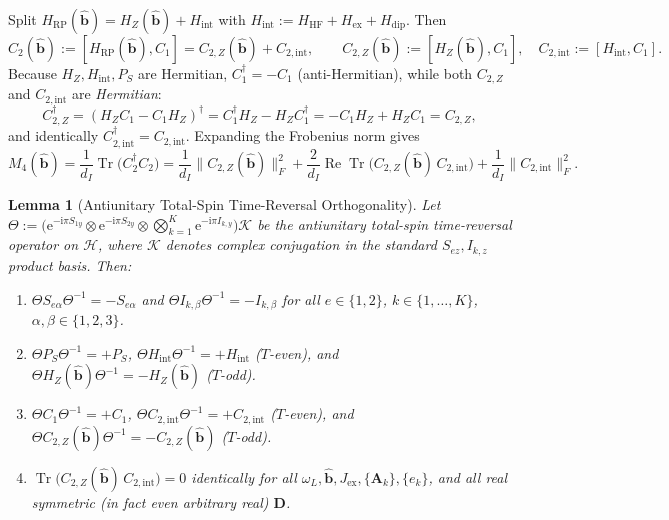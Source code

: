 \documentclass[onecolumn,10pt,notitlepage,amsmath,amssymb,floatfix]{revtex4-2}
\theoremstyle{plain}
\newtheorem{lemma}[theorem]{Lemma}
\theoremstyle{definition}
\newcommand{\ii}{\mathrm{i}}
\newcommand{\ee}{\mathrm{e}}
\newcommand{\Tr}{\operatorname{Tr}}
\newcommand{\PS}{P_S}
\newcommand{\HRP}{H_{\mathrm{RP}}}
\newcommand{\HZ}{H_Z}
\newcommand{\HHF}{H_{\mathrm{HF}}}
\newcommand{\Hex}{H_{\mathrm{ex}}}
\newcommand{\Hdip}{H_{\mathrm{dip}}}
\newcommand{\Hint}{H_{\mathrm{int}}}
\begin{document}
Split $\HRP(\hat{\mathbf{b}}) = \HZ(\hat{\mathbf{b}}) + \Hint$ with $\Hint := \HHF + \Hex + \Hdip$. Then
\begin{equation}
\label{eq:S1_C2_split}
C_2(\hat{\mathbf{b}}) := [\HRP(\hat{\mathbf{b}}), C_1] = C_{2,Z}(\hat{\mathbf{b}}) + C_{2,\mathrm{int}}, \qquad
C_{2,Z}(\hat{\mathbf{b}}) := [\HZ(\hat{\mathbf{b}}), C_1], \quad
C_{2,\mathrm{int}} := [\Hint, C_1].
\end{equation}
Because $\HZ, \Hint, \PS$ are Hermitian, $C_1^\dagger = -C_1$ (anti-Hermitian), while both $C_{2,Z}$ and $C_{2,\mathrm{int}}$ are \emph{Hermitian}:
\[
C_{2,Z}^\dagger = (\HZ C_1 - C_1 \HZ)^\dagger = C_1^\dagger \HZ - \HZ C_1^\dagger = -C_1 \HZ + \HZ C_1 = C_{2,Z},
\]
and identically $C_{2,\mathrm{int}}^\dagger = C_{2,\mathrm{int}}$. Expanding the Frobenius norm gives
\begin{equation}
\label{eq:S1_M4_expand}
M_4(\hat{\mathbf{b}}) = \frac{1}{d_I}\Tr\big(C_2^\dagger C_2\big)
= \frac{1}{d_I}\|C_{2,Z}(\hat{\mathbf{b}})\|_F^2
+ \frac{2}{d_I}\operatorname{Re}\Tr\big(C_{2,Z}(\hat{\mathbf{b}})\,C_{2,\mathrm{int}}\big)
+ \frac{1}{d_I}\|C_{2,\mathrm{int}}\|_F^2.
\end{equation}

\begin{lemma}[Antiunitary Total-Spin Time-Reversal Orthogonality]
\label{lem:S1_TR_orthog}
Let $\Theta := \big(\ee^{-\ii\pi S_{1y}} \otimes \ee^{-\ii\pi S_{2y}} \otimes \bigotimes_{k=1}^K \ee^{-\ii\pi I_{k,y}}\big)\mathcal{K}$ be the antiunitary total-spin time-reversal operator on $\mathcal{H}$, where $\mathcal{K}$ denotes complex conjugation in the standard $S_{ez}, I_{k,z}$ product basis. Then:
\begin{enumerate}[label=(\roman*),leftmargin=1.8em,itemsep=2pt]
\item $\Theta S_{e\alpha} \Theta^{-1} = -S_{e\alpha}$ and $\Theta I_{k,\beta} \Theta^{-1} = -I_{k,\beta}$ for all $e\in\{1,2\}$, $k\in\{1,\dots,K\}$, $\alpha,\beta\in\{1,2,3\}$.
\item $\Theta \PS \Theta^{-1} = +\PS$, $\Theta \Hint \Theta^{-1} = +\Hint$ ($T$-even), and $\Theta \HZ(\hat{\mathbf{b}}) \Theta^{-1} = -\HZ(\hat{\mathbf{b}})$ ($T$-odd).
\item $\Theta C_1 \Theta^{-1} = +C_1$, $\Theta C_{2,\mathrm{int}} \Theta^{-1} = +C_{2,\mathrm{int}}$ ($T$-even), and $\Theta C_{2,Z}(\hat{\mathbf{b}}) \Theta^{-1} = -C_{2,Z}(\hat{\mathbf{b}})$ ($T$-odd).
\item $\Tr\big(C_{2,Z}(\hat{\mathbf{b}})\,C_{2,\mathrm{int}}\big) = 0$ identically for all $\omega_L, \hat{\mathbf{b}}, J_{\mathrm{ex}}, \{\mathbf{A}_k\}, \{e_k\}$, and all real symmetric (in fact even arbitrary real) $\mathbf{D}$.
\end{enumerate}
\end{lemma}
\end{document}
